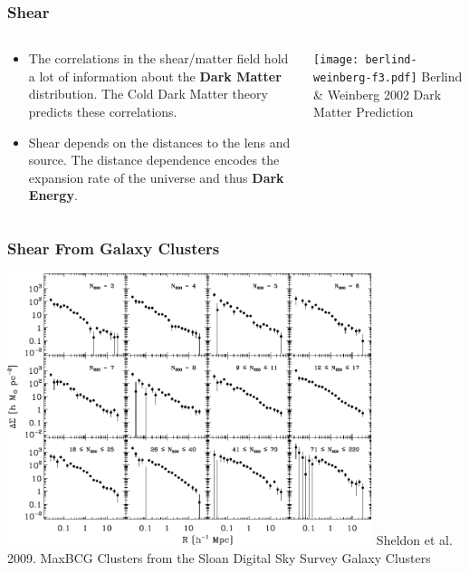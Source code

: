 \documentclass{beamer}
\begin{document}
\frame
{
    \frametitle{Shear}

    \begin{columns}
        \begin{column}{0.5\textwidth}
            \begin{itemize}


                \item The correlations in the shear/matter field hold a lot of
                    information about the {\bf Dark Matter} distribution.  The Cold Dark
                    Matter theory predicts these correlations.

                \item Shear depends on the distances to the lens and source. The
                    distance dependence encodes the expansion rate of the universe and
                    thus {\bf Dark Energy}.


            \end{itemize}
        \end{column}

        \begin{column}{0.5\textwidth}
                \texttt{[image: berlind-weinberg-f3.pdf]}
                \newline
                Berlind \& Weinberg 2002
                \newline
                Dark Matter Prediction
        \end{column}
    \end{columns}
}




\frame
{
    \frametitle{Shear From Galaxy Clusters}

    \begin{center}
        \includegraphics[width=0.8\textwidth]{maxbcg_sample21-22_ngals200_12_jackknife.pdf}
        \newline
        Sheldon et al. 2009.  MaxBCG Clusters from the Sloan Digital Sky Survey Galaxy Clusters
    \end{center}
}
\end{document}
